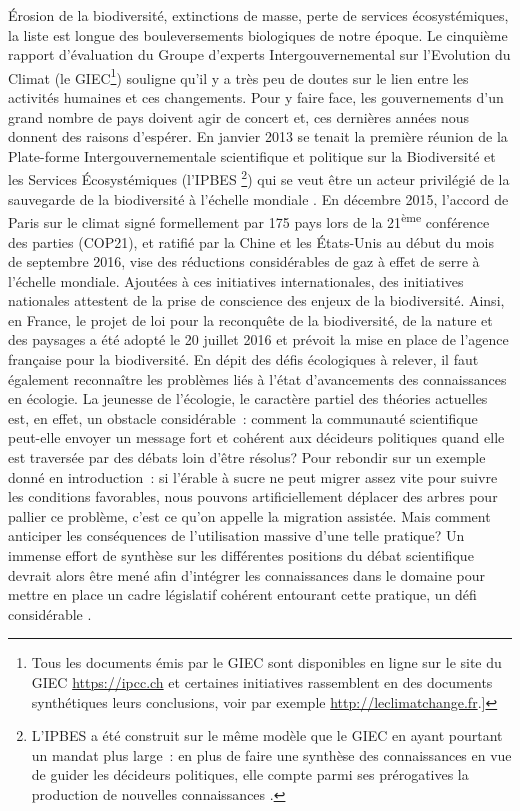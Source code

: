 Érosion de la biodiversité, extinctions de masse, perte de services
écosystémiques, la liste est longue des bouleversements biologiques de
notre époque. Le cinquième rapport d'évaluation du Groupe d'experts
Intergouvernemental sur l'Evolution du Climat (le GIEC\footnote{Tous les
  documents émis par le GIEC sont disponibles en ligne sur le site du
  GIEC \url{https://ipcc.ch} et certaines initiatives rassemblent en des
  documents synthétiques leurs conclusions, voir par exemple
  \url{http://leclimatchange.fr}.{]}}) souligne qu'il y a très peu de
doutes sur le lien entre les activités humaines et ces changements. Pour
y faire face, les gouvernements d'un grand nombre de pays doivent agir
de concert et, ces dernières années nous donnent des raisons d'espérer.
En janvier 2013 se tenait la première réunion de la Plate-forme
Intergouvernementale scientifique et politique sur la Biodiversité et
les Services Écosystémiques (l'IPBES \footnote{L'IPBES a été construit
  sur le même modèle que le GIEC en ayant pourtant un mandat plus
  large~: en plus de faire une synthèse des connaissances en vue de
  guider les décideurs politiques, elle compte parmi ses prérogatives la
  production de nouvelles connaissances \citep{Brooks2014}.}) qui se
veut être un acteur privilégié de la sauvegarde de la biodiversité à
l'échelle mondiale \citep{Diaz2015a}. En décembre 2015, l'accord de
Paris sur le climat signé formellement par 175 pays lors de la
21\textsuperscript{ème} conférence des parties (COP21), et ratifié par
la Chine et les États-Unis au début du mois de septembre 2016, vise des
réductions considérables de gaz à effet de serre à l'échelle mondiale.
Ajoutées à ces initiatives internationales, des initiatives nationales
attestent de la prise de conscience des enjeux de la biodiversité.
Ainsi, en France, le projet de loi pour la reconquête de la
biodiversité, de la nature et des paysages a été adopté le 20 juillet
2016 et prévoit la mise en place de l'agence française pour la
biodiversité. En dépit des défis écologiques à relever, il faut
également reconnaître les problèmes liés à l'état d'avancements des
connaissances en écologie. La jeunesse de l'écologie, le caractère
partiel des théories actuelles est, en effet, un obstacle considérable~:
comment la communauté scientifique peut-elle envoyer un message fort et
cohérent aux décideurs politiques quand elle est traversée par des
débats loin d'être résolus? Pour rebondir sur un exemple donné en
introduction~: si l'érable à sucre ne peut migrer assez vite pour suivre
les conditions favorables, nous pouvons artificiellement déplacer des
arbres pour pallier ce problème, c'est ce qu'on appelle la migration
assistée. Mais comment anticiper les conséquences de l'utilisation
massive d'une telle pratique? Un immense effort de synthèse sur les
différentes positions du débat scientifique devrait alors être mené afin
d'intégrer les connaissances dans le domaine pour mettre en place un
cadre législatif cohérent entourant cette pratique, un défi considérable
\citep{McLachlan2007}.

